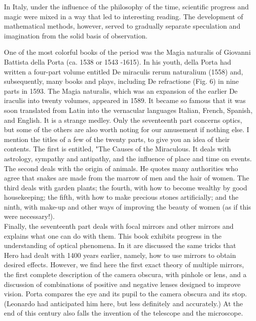            In Italy, under the influence of the philosophy of the time, scientific progress and magic were mixed in a way that led to interesting reading. The development of mathematical methods, however, served to gradually separate speculation and imagination from the solid basis of observation. 
            
            One of the most colorful books of the period was the Magia naturalis of Giovanni Battista della Porta (ca. 1538 or 1543 -1615). In his youth, della Porta had written a four-part volume entitled De miraculis rerum naturalium (1558) and, subsequently, many books and plays, including De refractione (Fig. 6) in nine parts in 1593. The Magia naturalis, which was an expansion of the earlier De iraculis into twenty volumes, appeared in 1589. It became so famous that it was soon translated from Latin into the vernacular languages Italian, French, Spanish, and English. It is a strange medley. Only the seventeenth part concerns optics, but some of the others are also worth noting for our amusement if nothing else. I mention the titles of a few of the twenty parts, to give you an idea of their contents. The first is entitled, "The Causes of the Miraculous. It deals with astrology, sympathy and antipathy, and the influence of place and time on events. The second deals with the origin of animals. He quotes many authorities who agree that snakes are made from the marrow of men and the hair of women. The third deals with garden plants; the fourth, with how to become wealthy by good housekeeping; the fifth, with how to make precious stones artificially; and the ninth, with make-up and other ways of improving the beauty of women (as if this were necessary!).\\

            Finally, the seventeenth part deals with focal mirrors and other mirrors and explains what one can do with them. This book exhibits progress in the understanding of optical phenomena. In it are discussed the same tricks that Hero had dealt with 1400 years earlier, namely, how to use mirrors to obtain desired effects. However, we find here the first exact theory of multiple mirrors, the first complete description of the camera obscura, with pinhole or lens, and a discussion of combinations of positive and negative lenses designed to improve vision. Porta compares the eye and its pupil to the camera obscura and its stop. (Leonardo had anticipated him here, but less definitely and accurately.) At the end of this century also falls the invention of the telescope and the microscope. \\
            
